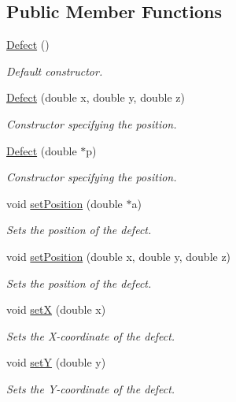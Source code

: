 \subsection*{Public Member Functions}
\begin{DoxyCompactItemize}
\item 
\hyperlink{classDefect_afc84dd2d7250a01746ee67b002dbbad9}{Defect} ()
\begin{DoxyCompactList}\small\item\em Default constructor. \end{DoxyCompactList}\item 
\hyperlink{classDefect_aaddcb1db4b47037adf2e495665f41bab}{Defect} (double x, double y, double z)
\begin{DoxyCompactList}\small\item\em Constructor specifying the position. \end{DoxyCompactList}\item 
\hyperlink{classDefect_a5bd123214102a5115c46b0a15653d29b}{Defect} (double $\ast$p)
\begin{DoxyCompactList}\small\item\em Constructor specifying the position. \end{DoxyCompactList}\item 
void \hyperlink{classDefect_a2d233d13a8a93f6fba463a1fbc1c6c9f}{set\-Position} (double $\ast$a)
\begin{DoxyCompactList}\small\item\em Sets the position of the defect. \end{DoxyCompactList}\item 
void \hyperlink{classDefect_ad1a6acd8399d2ecabb7ce2b77623bbec}{set\-Position} (double x, double y, double z)
\begin{DoxyCompactList}\small\item\em Sets the position of the defect. \end{DoxyCompactList}\item 
void \hyperlink{classDefect_a5a65f73da6a572d9e7109b31239e441d}{set\-X} (double x)
\begin{DoxyCompactList}\small\item\em Sets the X-\/coordinate of the defect. \end{DoxyCompactList}\item 
void \hyperlink{classDefect_a268606391a4eaee3de029d2005648b6f}{set\-Y} (double y)
\begin{DoxyCompactList}\small\item\em Sets the Y-\/coordinate of the defect. \end{DoxyCompactList}\item 

\end{DoxyCompactItemize}
